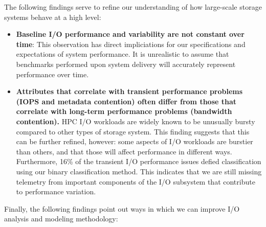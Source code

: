 The following findings serve to refine our understanding of how large-scale storage
systems behave at a high level: 

\begin{itemize}[leftmargin=*]

\item \textbf{Baseline I/O performance and variability are not constant over
time}: This observation has direct impliciations for our specifications and
expectations of system performance.  It is unrealistic to assume that
benchmarks performed upon system delivery will accurately represent
performance over time.

\item \textbf{Attributes that correlate with transient performance problems (IOPS
and metadata contention) often differ from those that correlate with
long-term performance problems (bandwidth contention).} HPC I/O workloads
are widely known to be unusually bursty compared to other types of storage
system. This finding suggests that this can be further refined, however:
some aspects of I/O workloads are burstier than others, and that those
will affect performance in different ways.  Furthermore, 16\% of the transient I/O performance issues defied classification using our binary classification method.
This indicates that we are still missing telemetry from important components of the I/O subsystem that contribute to performance variation. 

\end{itemize}

Finally, the following findings point out ways in which we can improve
I/O analysis and modeling methodology:

